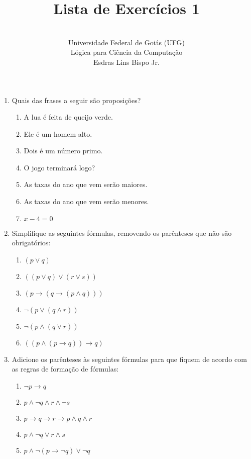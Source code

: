 \documentclass[12pt,a4paper,oneside]{article}
\author{\\Universidade Federal de Goiás (UFG) \\Lógica para Ciência da Computação \\Esdras Lins Bispo Jr.}
\title{\sc \huge Lista de Exercícios 1}
\begin{document}
\maketitle

\begin{enumerate}

	\item Quais das frases a seguir são proposições?

		\begin{enumerate}
			\item A lua é feita de queijo verde.
			\item Ele é um homem alto.
			\item Dois é um número primo.
			\item O jogo terminará logo?
			\item As taxas do ano que vem serão maiores.
			\item As taxas do ano que vem serão menores.
			\item $x - 4 = 0$
		\end{enumerate}
	
	\item Simplifique as seguintes fórmulas, removendo os parênteses que não são obrigatórios:

		\begin{enumerate}
			\item $(p \vee q)$
			\item $((p \vee q) \vee (r \vee s))$
			\item $(p \rightarrow (q \rightarrow (p \wedge q)))$
			\item $\neg (p \vee (q \wedge r))$
			\item $\neg (p \wedge (q \vee r))$
			\item $((p \wedge (p \rightarrow q)) \rightarrow q)$
		\end{enumerate}
		
	\item Adicione os parênteses às seguintes fórmulas para que fiquem de acordo com as regras de formação de fórmulas:
	
		\begin{enumerate}
			\item $\neg p \rightarrow q$
			\item $p \wedge \neg q \wedge r \wedge \neg s$
			\item $p \rightarrow q \rightarrow r \rightarrow p \wedge q \wedge r$
			\item $p \wedge \neg q \vee r \wedge s$
			\item $p \wedge \neg (p \rightarrow \neg q) \vee \neg q$
		\end{enumerate}
	

\end{enumerate}
\end{document}
